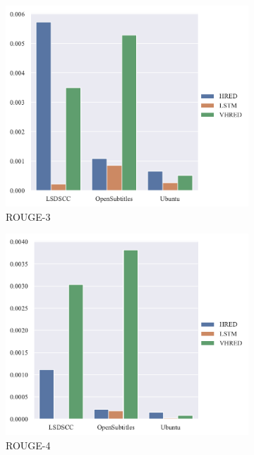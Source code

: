 \begin{figure}[H]
    \begin{subfigure}{0.4\linewidth}
        \centering
        \includegraphics[width=\linewidth]{figure/barplot/rouge_3/plot.pdf}
        \caption{ROUGE-3}
    \end{subfigure}%
    \begin{subfigure}{0.4\linewidth}
        \centering
        \includegraphics[width=\linewidth]{figure/barplot/rouge_4/plot.pdf}
        \caption{ROUGE-4}
    \end{subfigure}
    \centering
    \begin{subfigure}{0.4\linewidth}

\end{subfigure}
\end{figure}
